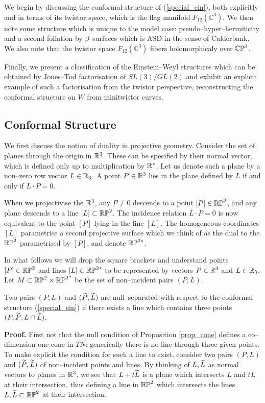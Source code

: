 We begin by discussing the  conformal structure
of (\ref{special_ein}), both explicitly and in terms of its twistor space, which is the flag manifold $F_{12}(\mathbb{C}^3)$. We then note some structure which is unique to the model case: pseudo--hyper--hermiticity and a second foliation by $\beta$--surfaces which is ASD in the sense of Calderbank. We also note that the twistor space  $F_{12}(\mathbb{C}^3)$ fibers holomorphicaly over $\mathbb{CP}^1$.

Finally, we present a classification of the Einstein--Weyl structures which can be obtained by Jones--Tod factorisation of $SL(3)/GL(2)$ and exhibit an explicit example of such a factorisation from the twistor perspective, reconstructing the conformal structure on $W$ from minitwistor curves.
\subsection{Conformal Structure}
\label{model_conf}
We first discuss the notion of duality in projective geometry. Consider the set of planes through the origin in $\mathbb{R}^3$. These can be specified by their normal vector, which is defined only up to multiplication by $\mathbb{R}^*$. Let us denote such a plane by a non--zero row vector $L\in\mathbb{R}_3$. A point $P\in\mathbb{R}^3$ lies in the plane defined by $L$ if and only if $L\cdot P=0$.

When we projectivise the $\mathbb{R}^3$, any $P\neq 0$ descends to a point $[P]\in\mathbb{RP}^2$, and any plane descends to a line $[L]\subset\mathbb{RP}^2$. The incidence relation $L\cdot P=0$ is now equivalent to the point $[P]$ lying in the line $[L]$. The homogeneous coordinates $[L]$ parametrise a second projective surface which we think of as the dual to the $\mathbb{RP}^2$ parametrised by $[P]$, and denote $\mathbb{RP}^{2*}$.

In what follows we will drop the square brackets and understand points $[P]\in\mathbb{RP}^2$ and lines $[L]\in\mathbb{RP}^{2*}$ to be represented by vectors $P\in\mathbb{R}^3$ and $L\in\mathbb{R}_3$. Let $M\subset \mathbb{RP}^2\times {\mathbb{RP}^2}^*$ be the set of non--incident pairs 
$(P, L)$.
\begin{prop}
\label{prop_cone}
Two pairs $(P, L)$ and $(\widetilde{P}, \widetilde{L})$ are null--separated
with respect to the conformal structure (\ref{special_ein})
if there exists
a line which contains three points $(P, \widetilde{P}, L\cap \widetilde{L})$. 
\end{prop}
{\bf Proof.}
First not that the  null condition of Proposition \ref{prop_cone}
defines a co--dimension one cone in $TN$: 
generically there is no line through three given points. To make explicit the condition for such a line to exist, consider two pairs  $(P, L)$ and $(\widetilde{P}, \widetilde{L})$ 
of non--incident points and lines. By thinking of $L,\widetilde{L}$ as normal vectors to planes in $\mathbb{R}^3$, we see that $L+t\widetilde{L}$ is a plane which intersects $L$ and $tL$ at their intersection, thus defining a line in $\mathbb{RP}^2$ which intersects the lines $L,\widetilde{L}\subset\mathbb{RP}^2$ at their intersection.

